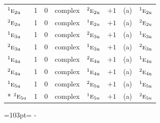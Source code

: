 \documentclass[10pt,a4paper]{article}
\newcommand{\needspace}[1]{\par\penalty-100\begingroup\dimen0=#1\relax\dimen2=\pagegoal
  \advance\dimen2-\pagetotal\ifdim\dimen0>\dimen2\relax\ifdim\dimen2>0pt\vfil\break\fi\fi
  \endgroup}
\numberwithin{equation}{section}
\newcommand{\irr}[1]{\text{\normalfont\scshape #1}}
\newcommand{\conjpair}[1]{{}^{#1}}
\newcommand{\ptag}[1]{\mathrm{#1}}
\begin{document}
{\begin{longtable}{@{}lrrllrll@{}}
$\conjpair{1}\irr{e}_{2\ptag{u}}$ & 1 & $0$ & complex & $\conjpair{2}\irr{e}_{2\ptag{u}}$ & $+1$ & (a) & $\conjpair{1}\irr{e}_{2\ptag{u}}$\\
$\conjpair{2}\irr{e}_{2\ptag{u}}$ & 1 & $0$ & complex & $\conjpair{1}\irr{e}_{2\ptag{u}}$ & $+1$ & (a) & $\conjpair{2}\irr{e}_{2\ptag{u}}$\\
$\conjpair{1}\irr{e}_{3\ptag{u}}$ & 1 & $0$ & complex & $\conjpair{2}\irr{e}_{3\ptag{u}}$ & $+1$ & (a) & $\conjpair{1}\irr{e}_{3\ptag{u}}$\\
$\conjpair{2}\irr{e}_{3\ptag{u}}$ & 1 & $0$ & complex & $\conjpair{1}\irr{e}_{3\ptag{u}}$ & $+1$ & (a) & $\conjpair{2}\irr{e}_{3\ptag{u}}$\\
$\conjpair{1}\irr{e}_{4\ptag{u}}$ & 1 & $0$ & complex & $\conjpair{2}\irr{e}_{4\ptag{u}}$ & $+1$ & (a) & $\conjpair{1}\irr{e}_{4\ptag{u}}$\\
$\conjpair{2}\irr{e}_{4\ptag{u}}$ & 1 & $0$ & complex & $\conjpair{1}\irr{e}_{4\ptag{u}}$ & $+1$ & (a) & $\conjpair{2}\irr{e}_{4\ptag{u}}$\\
$\conjpair{1}\irr{e}_{5\ptag{u}}$ & 1 & $0$ & complex & $\conjpair{2}\irr{e}_{5\ptag{u}}$ & $+1$ & (a) & $\conjpair{1}\irr{e}_{5\ptag{u}}$\\*
$\conjpair{2}\irr{e}_{5\ptag{u}}$ & 1 & $0$ & complex & $\conjpair{1}\irr{e}_{5\ptag{u}}$ & $+1$ & (a) & $\conjpair{2}\irr{e}_{5\ptag{u}}$\\
\bottomrule\end{longtable}}
\needspace{103pt}
\end{document}
